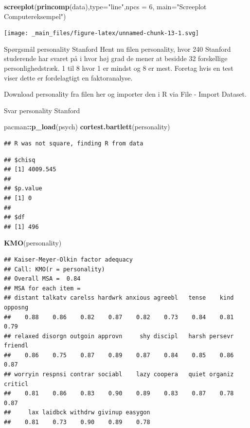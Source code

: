 \documentclass[]{book}
\newenvironment{Shaded}{\begin{snugshade}}{\end{snugshade}}
\newcommand{\DataTypeTok}[1]{\textcolor[rgb]{0.13,0.29,0.53}{#1}}
\newcommand{\DecValTok}[1]{\textcolor[rgb]{0.00,0.00,0.81}{#1}}
\newcommand{\KeywordTok}[1]{\textcolor[rgb]{0.13,0.29,0.53}{\textbf{#1}}}
\newcommand{\NormalTok}[1]{#1}
\newcommand{\OperatorTok}[1]{\textcolor[rgb]{0.81,0.36,0.00}{\textbf{#1}}}
\newcommand{\StringTok}[1]{\textcolor[rgb]{0.31,0.60,0.02}{#1}}
\begin{document}
\begin{Shaded}
\begin{Highlighting}[]
\KeywordTok{screeplot}\NormalTok{(}\KeywordTok{princomp}\NormalTok{(data),}\DataTypeTok{type=}\StringTok{"line"}\NormalTok{,}\DataTypeTok{npcs =} \DecValTok{6}\NormalTok{, }\DataTypeTok{main=}\StringTok{"Screeplot Computereksempel"}\NormalTok{)}
\end{Highlighting}
\end{Shaded}

\texttt{[image: \_main\_files/figure-latex/unnamed-chunk-13-1.svg]}

Spørgsmål personality Stanford
Hent nu filen personality, hvor 240 Stanford studerende har svaret på i hvor høj grad de mener at besidde 32 forskellige personlighedstræk. 1 til 8 hvor 1 er mindst og 8 er mest. Foretag hvis en test viser dette er fordelagtigt en faktoranalyse.

Download personality fra filen her og importer den i R via File - Import Dataset.

Svar personality Stanford

\begin{Shaded}
\begin{Highlighting}[]
\NormalTok{pacman}\OperatorTok{::}\KeywordTok{p_load}\NormalTok{(psych)}
\KeywordTok{cortest.bartlett}\NormalTok{(personality)}
\end{Highlighting}
\end{Shaded}

\begin{verbatim}
## R was not square, finding R from data
\end{verbatim}

\begin{verbatim}
## $chisq
## [1] 4009.545
## 
## $p.value
## [1] 0
## 
## $df
## [1] 496
\end{verbatim}

\begin{Shaded}
\begin{Highlighting}[]
\KeywordTok{KMO}\NormalTok{(personality)}
\end{Highlighting}
\end{Shaded}

\begin{verbatim}
## Kaiser-Meyer-Olkin factor adequacy
## Call: KMO(r = personality)
## Overall MSA =  0.84
## MSA for each item = 
## distant talkatv carelss hardwrk anxious agreebl   tense    kind opposng 
##    0.88    0.86    0.82    0.87    0.82    0.73    0.84    0.81    0.79 
## relaxed disorgn outgoin approvn     shy discipl   harsh persevr friendl 
##    0.86    0.75    0.87    0.89    0.87    0.84    0.85    0.86    0.87 
## worryin respnsi contrar sociabl    lazy coopera   quiet organiz criticl 
##    0.81    0.86    0.83    0.90    0.89    0.83    0.87    0.78    0.87 
##     lax laidbck withdrw givinup easygon 
##    0.81    0.73    0.90    0.89    0.78
\end{verbatim}
\end{document}
